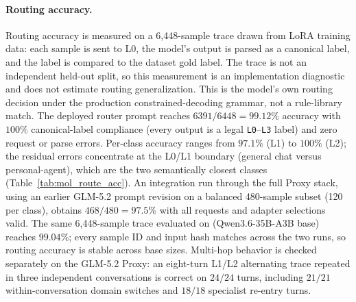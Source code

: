 \paragraph{Routing accuracy.}
Routing accuracy is measured on a 6{,}448-sample trace drawn from LoRA training data: each sample is sent to L0, the model's output is parsed as a canonical label, and the label is compared to the dataset gold label. The trace is not an independent held-out split, so this measurement is an implementation diagnostic and does not estimate routing generalization. This is the model's own routing decision under the production constrained-decoding grammar, not a rule-library match. The deployed router prompt reaches $6391/6448 = 99.12\%$ accuracy with $100\%$ canonical-label compliance (every output is a legal \texttt{L0}--\texttt{L3} label) and zero request or parse errors. Per-class accuracy ranges from $97.1\%$ (L1) to $100\%$ (L2); the residual errors concentrate at the L0/L1 boundary (general chat versus personal-agent), which are the two semantically closest classes (Table~\ref{tab:mol_route_acc}). An integration run through the full Proxy stack, using an earlier GLM-5.2 prompt revision on a balanced 480-sample subset (120 per class), obtains $468/480 = 97.5\%$ with all requests and adapter selections valid. The same 6{,}448-sample trace evaluated on \tall{} (Qwen3.6-35B-A3B base) reaches $99.04\%$; every sample ID and input hash matches across the two runs, so routing accuracy is stable across base sizes. Multi-hop behavior is checked separately on the GLM-5.2 Proxy: an eight-turn L1/L2 alternating trace repeated in three independent conversations is correct on $24/24$ turns, including $21/21$ within-conversation domain switches and $18/18$ specialist re-entry turns.

